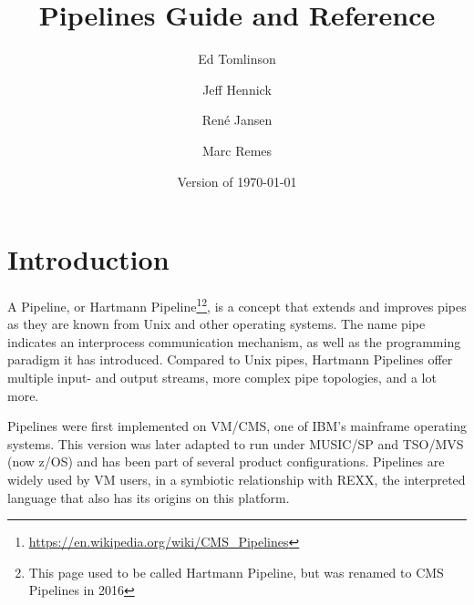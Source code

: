 

\renewcommand{\isbn}{978-90-819090-3-7}    
\setcounter{tocdepth}{1} 
\title{Pipelines Guide and Reference}
\author{Ed Tomlinson \and Jeff Hennick \and René Jansen \and Marc Remes}
\date{\null\hfill Version  of \today}
\maketitle
{}
\pagestyle{plain}
\frontmatter
{}

\pagestyle{plain}

\tableofcontents
\newpage
{}
\frontmatter
\large

%
\mainmatter%
\lstset{showstringspaces=false}
\lstset{keepspaces=true}




\chapter{Introduction}
A Pipeline, or Hartmann
Pipeline\footnote{\url{https://en.wikipedia.org/wiki/CMS_Pipelines}}\footnote{This
  page used to be called Hartmann Pipeline, but was renamed to CMS Pipelines
  in 2016}, is a concept that extends and improves pipes as they are known from Unix and other operating systems.
The name pipe indicates an interprocess communication mechanism, as well as the programming paradigm it has introduced. Compared to Unix pipes, Hartmann Pipelines offer multiple input- and output streams, more complex pipe topologies, and a lot more.

Pipelines were first implemented on VM/CMS, one of IBM's mainframe
operating systems. This version was later adapted to run under
MUSIC/SP and TSO/MVS (now z/OS) and has been part of several product configurations. Pipelines are
widely used by VM users, in a symbiotic relationship with REXX, the
interpreted language that also has its origins on this platform.

